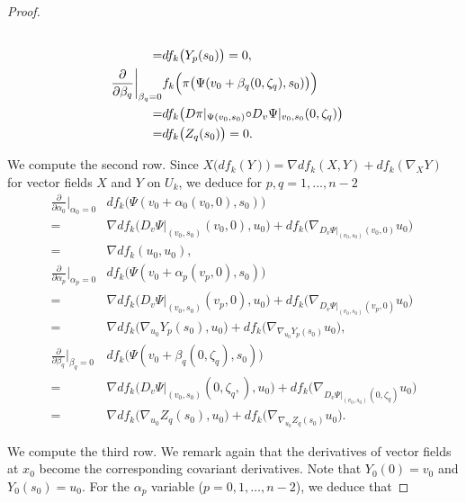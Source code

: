 \documentclass[a4paper,11pt,reqno]{amsart}
\numberwithin{equation}{section}
\theoremstyle{definition}
\theoremstyle{remark}
\begin{document}
\begin{proof}
\begin{align}
\nonumber
\\
  =
& df_k\bigl(Y_p(s_0)\bigr)
  =0, 
\label{equation:012}
\\
  \frac{\partial}{\partial \beta_q}\bigg\vert_{\beta_q=0}
& f_k\Bigl(\pi\bigl(\Psi(v_0+\beta_q(0,\zeta_q),s_0)\bigr)\Bigr)
\nonumber
\\
  =
& df_k\bigl(D\pi\vert_{\Psi(v_0,s_0)}{\circ}D_v\Psi\vert_{v_0,s_0}(0,\zeta_q)\bigr)
\nonumber
\\
  =
& df_k\bigl(Z_q(s_0)\bigr)
  =0.
\label{equation:013}
\end{align}
%
%
\par
%
%
We compute the second row. 
Since $X\bigl(df_k(Y)\bigr)=\nabla{df_k(X,Y)}+df_k(\nabla_XY)$ for vector fields $X$ and $Y$ on $U_k$, 
we deduce for $p,q=1,\dotsc,n-2$ 
%
%
\begin{align}
  \frac{\partial}{\partial \alpha_0}\bigg\vert_{\alpha_0=0}
& df_k\bigl(\Psi(v_0+\alpha_0(v_0,0),s_0)\bigr)
\nonumber
\\
  =
& {\nabla}df_k\bigl(D_v\Psi\vert_{(v_0,s_0)}(v_0,0),u_0\bigr)
  +
  df_k\bigl(\nabla_{D_v\Psi\vert_{(v_0,s_0)}(v_0,0)}u_0\bigr)
\nonumber
\\
  =
& {\nabla}df_k(u_0,u_0),
\label{equation:021}
\\
  \frac{\partial}{\partial \alpha_p}\bigg\vert_{\alpha_p=0}
& df_k\bigl(\Psi(v_0+\alpha_p(v_p,0),s_0)\bigr)
\nonumber
\\
  =
& {\nabla}df_k\bigl(D_v\Psi\vert_{(v_0,s_0)}(v_p,0),u_0\bigr)
  +
  df_k\bigl(\nabla_{D_v\Psi\vert_{(v_0,s_0)}(v_p,0)}u_0\bigr)
\nonumber
\\
  =
& {\nabla}df_k\bigl(\nabla_{u_0}Y_p(s_0),u_0\bigr)
  +
  df_k\bigl(\nabla_{\nabla_{u_0}Y_p(s_0)}u_0\bigr), 
\label{equation:022}
\\
  \frac{\partial}{\partial \beta_q}\bigg\vert_{\beta_q=0}
& df_k\bigl(\Psi(v_0+\beta_q(0,\zeta_q),s_0)\bigr)
\nonumber
\\
  =
& {\nabla}df_k\bigl(D_v\Psi\vert_{(v_0,s_0)}(0,\zeta_q,),u_0\bigr)
  +
  df_k\bigl(\nabla_{D_v\Psi\vert_{(v_0,s_0)}(0,\zeta_q)}u_0\bigr)
\nonumber
\\
  =
& {\nabla}df_k\bigl(\nabla_{u_0}Z_q(s_0),u_0\bigr)
  +
  df_k\bigl(\nabla_{\nabla_{u_0}Z_q(s_0)}u_0\bigr).  
\label{equation:023}
\end{align}
%
%
\par
%
%
We compute the third row. 
We remark again that the derivatives of vector fields at $x_0$ 
become the corresponding covariant derivatives. 
Note that $Y_0(0)=v_0$ and $Y_0(s_0)=u_0$. 
For the $\alpha_p$ variable ($p=0,1,\dotsc,n-2$), we deduce that 

\end{proof}
\end{document}
